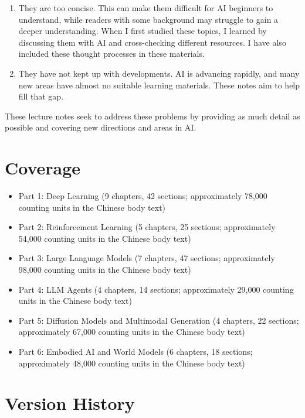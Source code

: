 \begin{enumerate}
\def\labelenumi{\arabic{enumi}.}
\item
  They are too concise. This can make them difficult for AI beginners to understand, while readers with some background may struggle to gain a deeper understanding. When I first studied these topics, I learned by discussing them with AI and cross-checking different resources. I have also included these thought processes in these materials.
\item
  They have not kept up with developments. AI is advancing rapidly, and many new areas have almost no suitable learning materials. These notes aim to help fill that gap.
\end{enumerate}

These lecture notes seek to address these problems by providing as much detail as possible and covering new directions and areas in AI.

\hypertarget{coverage}{%
\section{Coverage}\label{coverage}}

\begin{itemize}
\tightlist
\item
  Part 1: Deep Learning (9 chapters, 42 sections; approximately 78,000 counting units in the Chinese body text)
\item
  Part 2: Reinforcement Learning (5 chapters, 25 sections; approximately 54,000 counting units in the Chinese body text)
\item
  Part 3: Large Language Models (7 chapters, 47 sections; approximately 98,000 counting units in the Chinese body text)
\item
  Part 4: LLM Agents (4 chapters, 14 sections; approximately 29,000 counting units in the Chinese body text)
\item
  Part 5: Diffusion Models and Multimodal Generation (4 chapters, 22 sections; approximately 67,000 counting units in the Chinese body text)
\item
  Part 6: Embodied AI and World Models (6 chapters, 18 sections; approximately 48,000 counting units in the Chinese body text)
\end{itemize}

\hypertarget{version-history}{%
\section{Version History}\label{version-history}}

